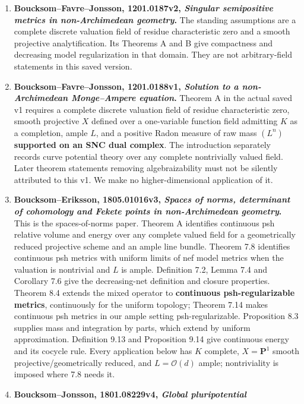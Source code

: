 \documentclass[
  11pt,
]{article}
\begin{document}
\begin{enumerate}
\def\labelenumi{\arabic{enumi}.}
\item
  \textbf{Boucksom--Favre--Jonsson, 1201.0187v2, \emph{Singular
  semipositive metrics in non-Archimedean geometry}.} The standing
  assumptions are a complete discrete valuation field of residue
  characteristic zero and a smooth projective analytification. Its
  Theorems A and B give compactness and decreasing model regularization
  in that domain. They are not arbitrary-field statements in this saved
  version.
\item
  \textbf{Boucksom--Favre--Jonsson, 1201.0188v1, \emph{Solution to a
  non-Archimedean Monge--Ampere equation}.} Theorem A in the actual
  saved v1 requires a complete discrete valuation field of residue
  characteristic zero, smooth projective \(X\) defined over a
  one-variable function field admitting \(K\) as a completion, ample
  \(L\), and a positive Radon measure of raw mass \((L^n)\)
  \textbf{supported on an SNC dual complex}. The introduction separately
  records curve potential theory over any complete nontrivially valued
  field. Later theorem statements removing algebraizability must not be
  silently attributed to this v1. We make no higher-dimensional
  application of it.
\item
  \textbf{Boucksom--Eriksson, 1805.01016v3, \emph{Spaces of norms,
  determinant of cohomology and Fekete points in non-Archimedean
  geometry}.} This is the spaces-of-norms paper. Theorem A identifies
  continuous psh relative volume and energy over any complete valued
  field for a geometrically reduced projective scheme and an ample line
  bundle. Theorem 7.8 identifies continuous psh metrics with uniform
  limits of nef model metrics when the valuation is nontrivial and \(L\)
  is ample. Definition 7.2, Lemma 7.4 and Corollary 7.6 give the
  decreasing-net definition and closure properties. Theorem 8.4 extends
  the mixed operator to \textbf{continuous psh-regularizable metrics},
  continuously for the uniform topology; Theorem 7.14 makes continuous
  psh metrics in our ample setting psh-regularizable. Proposition 8.3
  supplies mass and integration by parts, which extend by uniform
  approximation. Definition 9.13 and Proposition 9.14 give continuous
  energy and its cocycle rule. Every application below has \(K\)
  complete, \(X=\mathbf P^1\) smooth projective/geometrically reduced,
  and \(L=\mathcal O(d)\) ample; nontriviality is imposed where 7.8
  needs it.
\item
  \textbf{Boucksom--Jonsson, 1801.08229v4, \emph{Global pluripotential
}}
\end{enumerate}
\end{document}
